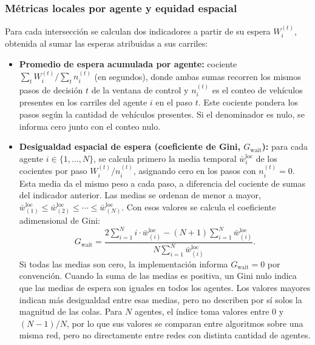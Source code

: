\subsubsection{Métricas locales por agente y equidad espacial}

Para cada intersección se calculan dos indicadores a partir de su espera $W_i^{(t)}$, obtenida al sumar las esperas atribuidas a sus carriles:
\begin{itemize}
    \item \textbf{Promedio de espera acumulada por agente:} cociente $\sum_t W_i^{(t)} / \sum_t n_i^{(t)}$ (en segundos), donde ambas sumas recorren los mismos pasos de decisión $t$ de la ventana de control y $n_i^{(t)}$ es el conteo de vehículos presentes en los carriles del agente $i$ en el paso $t$. Este cociente pondera los pasos según la cantidad de vehículos presentes. Si el denominador es nulo, se informa cero junto con el conteo nulo.
    \item \textbf{Desigualdad espacial de espera (coeficiente de Gini, $G_{\text{wait}}$):} para cada agente $i \in \{1,\ldots,N\}$, se calcula primero la media temporal $\bar{w}_i^{\mathrm{loc}}$ de los cocientes por paso $W_i^{(t)}/n_i^{(t)}$, asignando cero en los pasos con $n_i^{(t)}=0$. Esta media da el mismo peso a cada paso, a diferencia del cociente de sumas del indicador anterior. Las medias se ordenan de menor a mayor, $\bar{w}_{(1)}^{\mathrm{loc}} \le \bar{w}_{(2)}^{\mathrm{loc}} \le \cdots \le \bar{w}_{(N)}^{\mathrm{loc}}$. Con esos valores se calcula el coeficiente adimensional de Gini:
    \begin{equation}
        G_{\text{wait}} = \frac{2 \sum_{i=1}^{N} i \cdot \bar{w}_{(i)}^{\mathrm{loc}} - (N + 1) \sum_{i=1}^{N} \bar{w}_{(i)}^{\mathrm{loc}}}{N \sum_{i=1}^{N} \bar{w}_{(i)}^{\mathrm{loc}}}.
        \label{eq:gini_espera}
    \end{equation}
    Si todas las medias son cero, la implementación informa $G_{\text{wait}}=0$ por convención. Cuando la suma de las medias es positiva, un Gini nulo indica que las medias de espera son iguales en todos los agentes. Los valores mayores indican más desigualdad entre esas medias, pero no describen por sí solos la magnitud de las colas. Para $N$ agentes, el índice toma valores entre $0$ y $(N-1)/N$, por lo que sus valores se comparan entre algoritmos sobre una misma red, pero no directamente entre redes con distinta cantidad de agentes.
\end{itemize}


